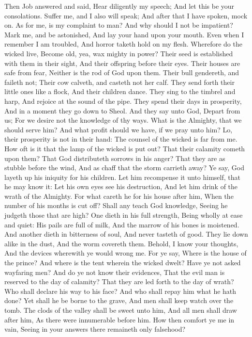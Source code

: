 Then Job answered and said,  Hear diligently my speech; And let this be your consolations.  Suffer me, and I also will speak; And after that I have spoken, mock on.  As for me, is my complaint to man? And why should I not be impatient?  Mark me, and be astonished, And lay your hand upon your mouth.  Even when I remember I am troubled, And horror taketh hold on my flesh.  Wherefore do the wicked live, Become old, yea, wax mighty in power?  Their seed is established with them in their sight, And their offspring before their eyes.  Their houses are safe from fear, Neither is the rod of God upon them.  Their bull gendereth, and faileth not; Their cow calveth, and casteth not her calf.  They send forth their little ones like a flock, And their children dance.  They sing to the timbrel and harp, And rejoice at the sound of the pipe.  They spend their days in prosperity, And in a moment they go down to Sheol.  And they say unto God, Depart from us; For we desire not the knowledge of thy ways.  What is the Almighty, that we should serve him? And what profit should we have, if we pray unto him?  Lo, their prosperity is not in their hand: The counsel of the wicked is far from me.  How oft is it that the lamp of the wicked is put out? That their calamity cometh upon them? That God distributeth sorrows in his anger?  That they are as stubble before the wind, And as chaff that the storm carrieth away?  Ye say, God layeth up his iniquity for his children. Let him recompense it unto himself, that he may know it:  Let his own eyes see his destruction, And let him drink of the wrath of the Almighty.  For what careth he for his house after him, When the number of his months is cut off?  Shall any teach God knowledge, Seeing he judgeth those that are high?  One dieth in his full strength, Being wholly at ease and quiet:  His pails are full of milk, And the marrow of his bones is moistened.  And another dieth in bitterness of soul, And never tasteth of good.  They lie down alike in the dust, And the worm covereth them.  Behold, I know your thoughts, And the devices wherewith ye would wrong me.  For ye say, Where is the house of the prince? And where is the tent wherein the wicked dwelt?  Have ye not asked wayfaring men? And do ye not know their evidences,  That the evil man is reserved to the day of calamity? That they are led forth to the day of wrath?  Who shall declare his way to his face? And who shall repay him what he hath done?  Yet shall he be borne to the grave, And men shall keep watch over the tomb.  The clods of the valley shall be sweet unto him, And all men shall draw after him, As there were innumerable before him.  How then comfort ye me in vain, Seeing in your answers there remaineth only falsehood? 

